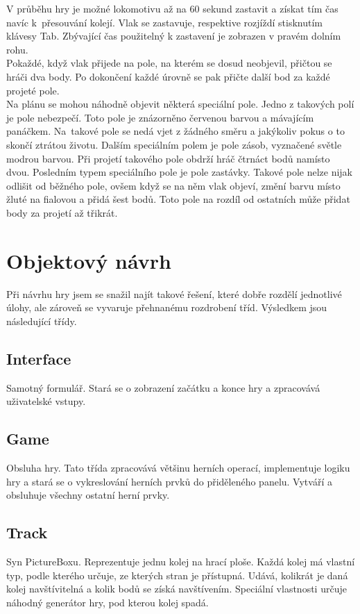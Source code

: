 \documentclass[11pt,a4paper]{scrreprt}
\begin{document}
V průběhu hry je možné lokomotivu až na 60 sekund zastavit a získat tím čas navíc k~přesouvání kolejí. Vlak se zastavuje, respektive rozjíždí stisknutím klávesy Tab. Zbývající čas použitelný k zastavení je zobrazen v pravém dolním rohu.\\

Pokaždé, když vlak přijede na pole, na kterém se dosud neobjevil, přičtou se hráči dva body. Po dokončení každé úrovně se pak přičte další bod za každé projeté pole.\\

Na plánu se mohou náhodně objevit některá speciální pole. Jedno z takových polí je pole nebezpečí. Toto pole je znázorněno červenou barvou a mávajícím panáčkem. Na~takové pole se nedá vjet z žádného směru a jakýkoliv pokus o to skončí ztrátou životu. Dalším speciálním polem je pole zásob, vyznačené světle modrou barvou. Při projetí takového pole obdrží hráč čtrnáct bodů namísto dvou. Posledním typem speciálního pole je pole zastávky. Takové pole nelze nijak odlišit od běžného pole, ovšem když se na něm vlak objeví, změní barvu místo žluté na fialovou a přidá šest bodů. Toto pole na rozdíl od ostatních může přidat body za projetí až třikrát.

\chapter{Objektový návrh}
Při návrhu hry jsem se snažil najít takové řešení, které dobře rozdělí jednotlivé úlohy, ale zároveň se vyvaruje přehnanému rozdrobení tříd. Výsledkem jsou následující třídy.

\section{Interface}
Samotný formulář. Stará se o zobrazení začátku a konce hry a zpracovává uživatelské vstupy.

\section{Game}
Obsluha hry. Tato třída zpracovává většinu herních operací, implementuje logiku hry a stará se o vykreslování herních prvků do přiděleného panelu. Vytváří a obsluhuje všechny ostatní herní prvky.

\section{Track}
Syn PictureBoxu. Reprezentuje jednu kolej na hrací ploše. Každá kolej má vlastní typ, podle kterého určuje, ze kterých stran je přístupná. Udává, kolikrát je daná kolej navštívitelná a kolik bodů se získá navštívením. Speciální vlastnosti určuje náhodný generátor hry, pod kterou kolej spadá. \\
\end{document}
